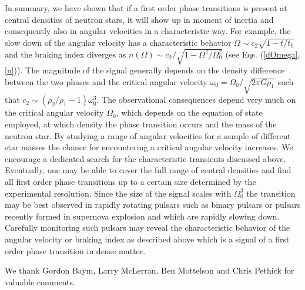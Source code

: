 \begin{multicols}{2}
In summary, we have shown that if a first order phase transitions is
present at central densities of neutron stars, it will show up in
moment of inertia and consequently also in angular velocities in a
characteristic way.
For example, the slow down of the angular velocity
has a characteristic behavior $\dot{\Omega}\sim
c_2\sqrt{1-t/t_0}$ and the braking index diverges as $n(\Omega)\sim
c_2/\sqrt{1-\Omega^2/\Omega_0^2}$ (see Eqs. (\ref{dOmega},\ref{n})).
The magnitude of the signal generally depends on the density
difference between the two phases and the critical angular velocity
$\omega_0=\Omega_0/\sqrt{2\pi G\rho_1}$ such that
$c_2\sim(\rho_2/\rho_1-1)\omega_0^3$.  The observational consequences
depend very much on the critical angular velocity $\Omega_0$, which
depends on the equation of state employed, at which density the phase
transition occurs and the mass of the neutron star. By studying a
range of angular velocities for a sample of different star masses the
chance for encountering a critical angular velocity increases.
We encourage a dedicated search for the characteristic transients
discussed above.
Eventually, one may be able to cover the full range of central
densities and find all first order phase transitions up to a certain size
determined by the experimental resolution.  Since the size of the
signal scales with $\Omega_0^3$ the transition may be best observed in
rapidly rotating pulsars such as binary pulsars or pulsars recently
formed in supernova explosion and which are rapidly slowing
down. Carefully monitoring such pulsars may reveal the characteristic
behavior of the angular velocity or braking index as
described above which is a signal of a first order phase transition in
dense matter.

We thank Gordon Baym, Larry McLerran, Ben Mottelson and
Chris Pethick for valuable comments.

\begin{references} 


\end{references}
\end{multicols}
